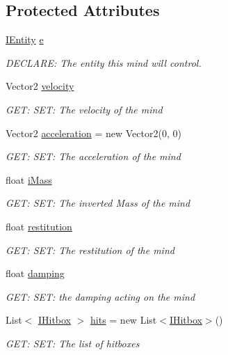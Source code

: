 \subsection*{Protected Attributes}
\begin{DoxyCompactItemize}
\item 
\hyperlink{a00438}{I\+Entity} \hyperlink{a00318_ad89c9691d6b32053fe8ffcdeb68bdacf}{e}
\begin{DoxyCompactList}\small\item\em D\+E\+C\+L\+A\+RE\+: The entity this mind will control. \end{DoxyCompactList}\item 
Vector2 \hyperlink{a00318_af56c17f56ba8133e32671318a6cc2c84}{velocity}
\begin{DoxyCompactList}\small\item\em G\+ET\+: S\+ET\+: The velocity of the mind \end{DoxyCompactList}\item 
Vector2 \hyperlink{a00318_a97534caf477680d0dcbe7021cc2b5a92}{acceleration} = new Vector2(0, 0)
\begin{DoxyCompactList}\small\item\em G\+ET\+: S\+ET\+: The acceleration of the mind \end{DoxyCompactList}\item 
float \hyperlink{a00318_a42f275657bd506946d9d7ec518cd4a22}{i\+Mass}
\begin{DoxyCompactList}\small\item\em G\+ET\+: S\+ET\+: The inverted Mass of the mind \end{DoxyCompactList}\item 
float \hyperlink{a00318_aca8c0c2865fe81c9bdabebcf7689c391}{restitution}
\begin{DoxyCompactList}\small\item\em G\+ET\+: S\+ET\+: The restitution of the mind \end{DoxyCompactList}\item 
float \hyperlink{a00318_aff4d26cdb8cbfeb96adfce9d92ddf5a0}{damping}
\begin{DoxyCompactList}\small\item\em G\+ET\+: S\+ET\+: the damping acting on the mind \end{DoxyCompactList}\item 
List$<$ \hyperlink{a00434}{I\+Hitbox} $>$ \hyperlink{a00318_a814329a8392c9a1f2d440c599dee3f91}{hits} = new List$<$\hyperlink{a00434}{I\+Hitbox}$>$()
\begin{DoxyCompactList}\small\item\em G\+ET\+: S\+ET\+: The list of hitboxes \end{DoxyCompactList}\item 

\end{DoxyCompactItemize}

